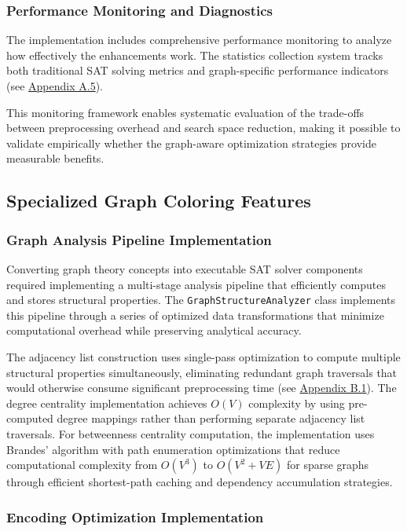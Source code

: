 \subsubsection{Performance Monitoring and Diagnostics}

The implementation includes comprehensive performance monitoring to analyze how effectively the enhancements work. The statistics collection system tracks both traditional SAT solving metrics and graph-specific performance indicators (see \hyperref[appendix:performance-monitoring]{Appendix A.5}).

This monitoring framework enables systematic evaluation of the trade-offs between preprocessing overhead and search space reduction, making it possible to validate empirically whether the graph-aware optimization strategies provide measurable benefits.

\subsection{Specialized Graph Coloring Features}

\subsubsection{Graph Analysis Pipeline Implementation}

Converting graph theory concepts into executable SAT solver components required implementing a multi-stage analysis pipeline that efficiently computes and stores structural properties. The \texttt{GraphStructureAnalyzer} class implements this pipeline through a series of optimized data transformations that minimize computational overhead while preserving analytical accuracy.

The adjacency list construction uses single-pass optimization to compute multiple structural properties simultaneously, eliminating redundant graph traversals that would otherwise consume significant preprocessing time (see \hyperref[appendix:graph-structure]{Appendix B.1}). The degree centrality implementation achieves $O(V)$ complexity by using pre-computed degree mappings rather than performing separate adjacency list traversals. For betweenness centrality computation, the implementation uses Brandes' algorithm with path enumeration optimizations that reduce computational complexity from $O(V^3)$ to $O(V^2 + VE)$ for sparse graphs through efficient shortest-path caching and dependency accumulation strategies.

\subsubsection{Encoding Optimization Implementation}

